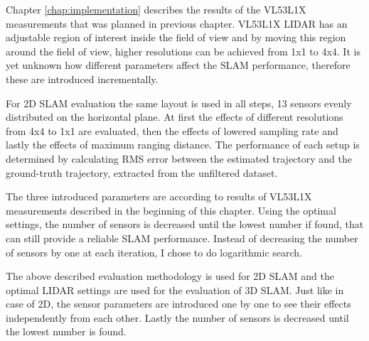 Chapter \ref{chap:implementation} describes the results of the VL53L1X measurements that was planned in previous chapter.
VL53L1X LIDAR has an adjustable region of interest inside the field of view and by moving this region around the field of view,
higher resolutions can be achieved from 1x1 to 4x4. It is yet unknown how different parameters affect the SLAM performance, 
therefore these are introduced incrementally. 

For 2D SLAM evaluation the same layout is used in all steps, 13 sensors evenly distributed on the horizontal 
plane. At first the effects of different resolutions from 4x4 to 1x1 are evaluated, then 
the effects of lowered sampling rate and lastly the effects of maximum ranging distance. The performance of each setup
is determined by calculating RMS error between the estimated trajectory and the ground-truth trajectory, extracted 
from the unfiltered dataset.

The three introduced parameters are according to results of VL53L1X measurements described in the beginning of this chapter.
Using the optimal settings, the number of sensors is decreased until the lowest number if found, that can still provide a 
reliable SLAM performance. Instead of decreasing the number of sensors by one at each iteration, I chose
to do logarithmic search.

The above described evaluation methodology is used for 2D SLAM and the optimal LIDAR settings are used for the evaluation 
of 3D SLAM. Just like in case of 2D, the sensor parameters are introduced one by one to see their effects independently 
from each other. Lastly the number of sensors is decreased until the lowest number is found.

